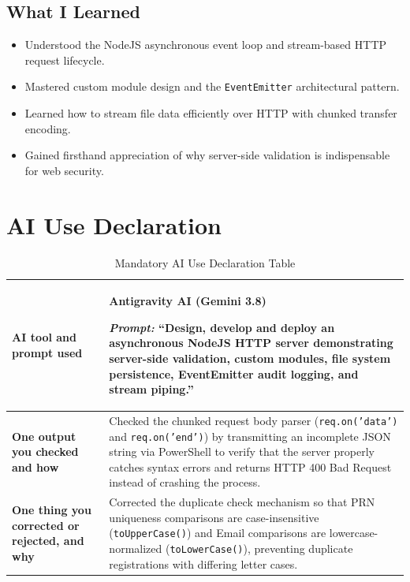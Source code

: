 \documentclass[11pt,a4paper]{article}
\begin{document}
\subsection{What I Learned}
\begin{itemize}
    \item Understood the NodeJS asynchronous event loop and stream-based HTTP request lifecycle.
    \item Mastered custom module design and the \texttt{EventEmitter} architectural pattern.
    \item Learned how to stream file data efficiently over HTTP with chunked transfer encoding.
    \item Gained firsthand appreciation of why server-side validation is indispensable for web security.
\end{itemize}

\section{AI Use Declaration}

\begin{table}[htbp]
\centering
\renewcommand{\arraystretch}{1.5}
\begin{tabularx}{\textwidth}{|p{4.5cm}|X|}
\hline
\textbf{AI tool and prompt used} & \textbf{Antigravity AI (Gemini 3.8)}\par
\textit{Prompt:} ``Design, develop and deploy an asynchronous NodeJS HTTP server demonstrating server-side validation, custom modules, file system persistence, EventEmitter audit logging, and stream piping.'' \\ \hline
\textbf{One output you checked and how} & Checked the chunked request body parser (\texttt{req.on('data')} and \texttt{req.on('end')}) by transmitting an incomplete JSON string via PowerShell to verify that the server properly catches syntax errors and returns HTTP 400 Bad Request instead of crashing the process. \\ \hline
\textbf{One thing you corrected or rejected, and why} & Corrected the duplicate check mechanism so that PRN uniqueness comparisons are case-insensitive (\texttt{toUpperCase()}) and Email comparisons are lowercase-normalized (\texttt{toLowerCase()}), preventing duplicate registrations with differing letter cases. \\ \hline
\end{tabularx}
\caption{Mandatory AI Use Declaration Table}
\end{table}
\end{document}
